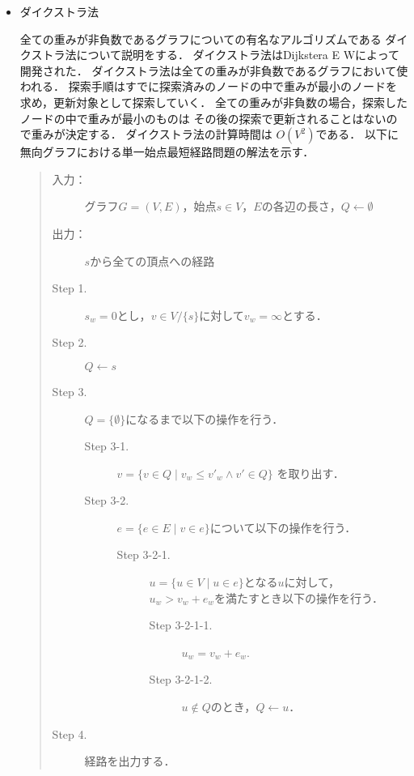 \documentclass[12pt]{optlab-bachelor}
\begin{document}
\begin{itemize}
  \item ダイクストラ法

  全ての重みが非負数であるグラフについての有名なアルゴリズムである
  ダイクストラ法について説明をする．
  ダイクストラ法はDijkstera E W\cite{Dijkstera}によって開発された．
  ダイクストラ法は全ての重みが非負数であるグラフにおいて使われる．
  探索手順はすでに探索済みのノードの中で重みが最小のノードを
  求め，更新対象として探索していく．
  全ての重みが非負数の場合，探索したノードの中で重みが最小のものは
  その後の探索で更新されることはないので重みが決定する．
  ダイクストラ法の計算時間は $O(V^2)$である．
  以下に無向グラフにおける単一始点最短経路問題の解法を示す．

  \begin{quote}
    \begin{description}
      \item[入力：] グラフ$G=(V,E)$，始点$s \in V$，$E$の各辺の長さ，$Q \leftarrow \emptyset$
      \item[出力：] $s$から全ての頂点への経路
      \item[Step 1.] $s_w = 0$とし，$v \in V/ \{ s\}$に対して$v_w = \infty$とする．
      \item[Step 2.] $Q \leftarrow s$
      \item[Step 3.] $Q = \{\emptyset\}$になるまで以下の操作を行う．
      \begin{description}
        \item[Step 3-1.] $v = \{ v \in Q \mid v_w \leq v'_w \land v' \in Q \}$
        を取り出す．
        \item[Step 3-2.] $e = \{ e \in E \mid v \in e \}$について以下の操作を行う．

        \begin{description}
          \item[Step 3-2-1.] $u = \{ u \in V \mid u \in e\}$となる$u$に対して，
          $u_w > v_w + e_w$を満たすとき以下の操作を行う．

          \begin{description}
            \item[Step 3-2-1-1.] $u_w = v_w + e_w$.
            \item[Step 3-2-1-2.] $u \notin Q$のとき，$Q \leftarrow u$．
          \end{description}
        \end{description}
      \end{description}

      \item[Step 4.] 経路を出力する．
    \end{description}
  \end{quote}
\end{itemize}
\end{document}
